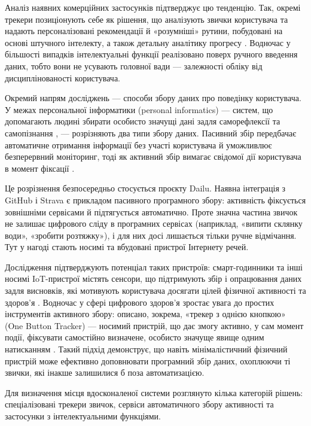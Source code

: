 Аналіз наявних комерційних застосунків підтверджує цю тенденцію.
Так, окремі трекери позиціонують себе як рішення, що аналізують звички користувача та надають
персоналізовані рекомендації й «розумніші» рутини, побудовані на основі штучного інтелекту, а
також детальну аналітику прогресу .
Водночас у більшості випадків інтелектуальні функції реалізовано поверх ручного введення даних,
тобто вони не усувають головної вади — залежності обліку від дисциплінованості користувача.


Окремий напрям досліджень — способи збору даних про поведінку користувача.
У межах персональної інформатики (personal informatics) — систем, що допомагають людині збирати
особисто значущі дані задля саморефлексії та самопізнання , — розрізняють два
типи збору даних.
Пасивний збір передбачає автоматичне отримання інформації без участі користувача й уможливлює
безперервний моніторинг, тоді як активний збір вимагає свідомої дії користувача в момент
фіксації .

Це розрізнення безпосередньо стосується проєкту Dailu.
Наявна інтеграція з GitHub і Strava є прикладом пасивного програмного збору: активність
фіксується зовнішніми сервісами й підтягується автоматично.
Проте значна частина звичок не залишає цифрового сліду в програмних сервісах (наприклад,
«випити склянку води», «зробити розтяжку»), і для них досі лишається тільки ручне відмічання.
Тут у нагоді стають носимі та вбудовані пристрої Інтернету речей.

Дослідження підтверджують потенціал таких пристроїв: смарт-годинники та інші носимі
IoT-пристрої містять сенсори, що підтримують збір і опрацювання даних задля висновків, які
мотивують користувача досягати цілей фізичної активності та здоров'я .
Водночас у сфері цифрового здоров'я зростає увага до простих інструментів активного збору:
описано, зокрема, «трекер з однією кнопкою» (One Button Tracker) — носимий пристрій, що дає
змогу активно, у сам момент події, фіксувати самостійно визначене, особисто значуще явище одним
натисканням .
Такий підхід демонструє, що навіть мінімалістичний фізичний пристрій може ефективно доповнювати
програмний збір даних, охоплюючи ті звички, які інакше залишилися б поза автоматизацією.


Для визначення місця вдосконаленої системи розглянуто кілька категорій рішень: спеціалізовані
трекери звичок, сервіси автоматичного збору активності та застосунки з інтелектуальними
функціями.

